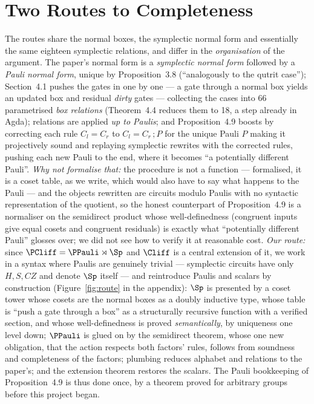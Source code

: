 \section{Two Routes to Completeness}\label{sec:routes}

The routes share the normal boxes, the symplectic normal form and
essentially the same eighteen symplectic relations, and differ in the
\emph{organisation} of the argument.  The paper's normal form is a
\emph{symplectic normal form} followed by a \emph{Pauli normal form}, unique by Proposition~3.8
(``analogously to the qutrit case''); Section~4.1 pushes the gates in one by one --- a gate
through a normal box yields an updated box and residual \emph{dirty}
gates --- collecting the cases into 66 parametrised \emph{box
relations} (Theorem~4.4 reduces them to 18, a step already in Agda);
relations are applied \emph{up to Paulis}; and Proposition~4.9
boosts by correcting each rule $C_l = C_r$ to $C_l = C_r\,;P$ for the
unique Pauli $P$ making it projectively sound and replaying symplectic
rewrites with the corrected rules, pushing each new Pauli to the end,
where it becomes ``a potentially different Pauli''.  \emph{Why not
formalise that:} the procedure is not a function --- formalised, it is
a coset table, as we write, which would also have to say what happens
to the Pauli --- and the objects rewritten are circuits modulo Paulis
with no syntactic representation of the quotient, so the honest
counterpart of Proposition~4.9 is a normaliser on the semidirect
product whose well-definedness (congruent inputs give equal cosets and
congruent residuals) is exactly what ``potentially different Pauli''
glosses over; we did not see how to verify it at reasonable cost.
\emph{Our route:} since $\PCliff = \PPauli \rtimes \Sp$ and $\Cliff$
is a central extension of it, we work in a syntax where Paulis are genuinely trivial
--- symplectic circuits have only $H, S, CZ$ and denote $\Sp$ itself ---
and reintroduce Paulis and scalars by construction
(Figure~\ref{fig:route} in the appendix): $\Sp$ is presented by a coset tower whose
cosets are the normal boxes as a doubly inductive type, whose table is
``push a gate through a box'' as a structurally recursive function with
a verified section, and whose well-definedness is proved
\emph{semantically}, by uniqueness one level down; $\PPauli$ is glued
on by the semidirect theorem, whose one new obligation, that the action
respects both factors' rules, follows from soundness and completeness
of the factors; plumbing reduces alphabet and relations to the paper's;
and the extension theorem restores the scalars.  The Pauli bookkeeping of
Proposition~4.9 is thus done once, by a theorem proved for arbitrary
groups before this project began.

